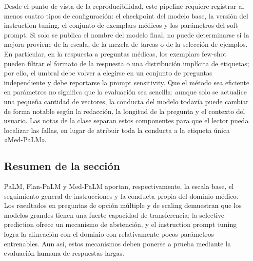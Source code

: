 Desde el punto de vista de la reproducibilidad, este pipeline requiere registrar al menos cuatro tipos de configuración: el checkpoint del modelo base, la versión del instruction tuning, el conjunto de exemplars médicos y los parámetros del soft prompt. Si solo se publica el nombre del modelo final, no puede determinarse si la mejora proviene de la escala, de la mezcla de tareas o de la selección de ejemplos. En particular, en la respuesta a preguntas médicas, los exemplars few-shot pueden filtrar el formato de la respuesta o una distribución implícita de etiquetas; por ello, el umbral debe volver a elegirse en un conjunto de preguntas independiente y debe reportarse la prompt sensitivity. Que el método sea eficiente en parámetros no significa que la evaluación sea sencilla: aunque solo se actualice una pequeña cantidad de vectores, la conducta del modelo todavía puede cambiar de forma notable según la redacción, la longitud de la pregunta y el contexto del usuario. Las notas de la clase separan estos componentes para que el lector pueda localizar las fallas, en lugar de atribuir toda la conducta a la etiqueta única «Med-PaLM».

\subsection{Resumen de la sección}

PaLM, Flan-PaLM y Med-PaLM aportan, respectivamente, la escala base, el seguimiento general de instrucciones y la conducta propia del dominio médico. Los resultados en preguntas de opción múltiple y de scaling demuestran que los modelos grandes tienen una fuerte capacidad de transferencia; la selective prediction ofrece un mecanismo de abstención, y el instruction prompt tuning logra la alineación con el dominio con relativamente pocos parámetros entrenables. Aun así, estos mecanismos deben ponerse a prueba mediante la evaluación humana de respuestas largas.
